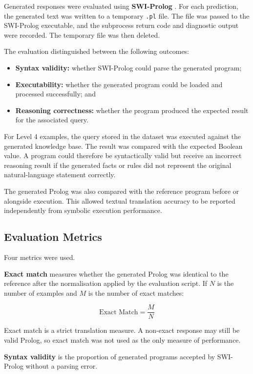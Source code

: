 \documentclass[11pt]{article} %
\theoremstyle{plain}
\theoremstyle{definition}
\begin{document}
Generated responses were evaluated using \textbf{SWI-Prolog} \cite{wielemaker2012swiprolog}. For each
prediction, the generated text was written to a temporary \texttt{.pl} file.
The file was passed to the SWI-Prolog executable, and the subprocess return code
and diagnostic output were recorded. The temporary file was then deleted.

The evaluation distinguished between the following outcomes:

\begin{itemize}
\item \textbf{Syntax validity:} whether SWI-Prolog could parse the generated
program;
\item \textbf{Executability:} whether the generated program could be loaded
and processed successfully; and
\item \textbf{Reasoning correctness:} whether the program produced the
expected result for the associated query.
\end{itemize}

For Level 4 examples, the query stored in the dataset was executed against the
generated knowledge base. The result was compared with the expected Boolean
value. A program could therefore be syntactically valid but receive an incorrect
reasoning result if the generated facts or rules did not represent the original
natural-language statement correctly.

The generated Prolog was also compared with the reference program before or
alongside execution. This allowed textual translation accuracy to be reported
independently from symbolic execution performance.

\subsection{Evaluation Metrics}

Four metrics were used.

\textbf{Exact match} measures whether the generated Prolog was identical to the
reference after the normalisation applied by the evaluation script. If \(N\) is
the number of examples and \(M\) is the number of exact matches:

$$
    \text{Exact Match} = \frac{M}{N}
$$

Exact match is a strict translation measure. A non-exact response may still be
valid Prolog, so exact match was not used as the only measure of performance.

\textbf{Syntax validity} is the proportion of generated programs accepted by
SWI-Prolog without a parsing error.
\end{document}
